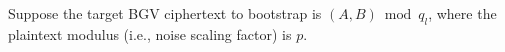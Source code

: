 \begin{comment}
$A'' \cdot S + B'' = p^{\varepsilon-1}M + p^\varepsilon E + Uq_l \pmod{q_l\hat{q}}$ \textcolor{red}{\# where $Uq_l$ includes $Kq_l$ plus the noise generated by \textsf{ModRaise\textsubscript{RNS}}'s \textsf{FastBConv} with \textsf{SmallMont}}

$ $

\item \textbf{\underline{$\textsf{ModSwitch}_{\textsf{RNS}}^{\textsf{BGV}}$}} from $q_l\hat{q} \rightarrow \hat{q}$, \textcolor{blue}{which effectively divides the $Uq_l$ error term by $q_l$ \textit{(uncertain if this is true)}}. Since the coefficients of $U$ are small relative to $p^\varepsilon$, they will stay in the (base-$p^\varepsilon$) low-digit area of the plaintext encrypted in the mod-switched new ciphertext $(A''', B''') \bmod \hat{q}$. This new ciphertext satisfies the relation:

$A'''S + B''' = p^{\epsilon-1}M + p^\varepsilon E' + U \pmod{\hat{q}}$ \textcolor{red}{ \# $E\rightarrow E'$ is an increase due to BGV's \textsf{ModSwitch} noise}

$ $

\item We do either: (i) \textsf{\underline{\textbf{FastBConv}}} from $\hat{q} \rightarrow q_L$ (if $\hat{q}$ does not divide $q_L$); or (ii) \textsf{\underline{\textbf{ModRaise\textsubscript{RNS}}}} (if $\hat{q}$ divides $q_L$). In both cases, we get a $\hat{q}$-overflow noise. The new ciphertext $(A'''', B'''') \bmod q_L$ satisfies the relation:

$A''''\cdot S + B'''' = p^{\varepsilon-1} M + p^{\varepsilon}E + U + U'\hat{q} \pmod{q_L}$ \textcolor{red}{ \# where $U'\hat{q}$ is a noise generated by this step}

$ $


\item The noises $U$ and $U'\hat{q}$ get removed by \textsf{CoeffToSlot}, digit extraction, and \textsf{SlotToCoeff}. 

\end{enumerate}

\clearpage
\end{comment}

Suppose the target BGV ciphertext to bootstrap is $(A, B) \bmod q_l$, where the plaintext modulus (i.e., noise scaling factor) is $p$. 

